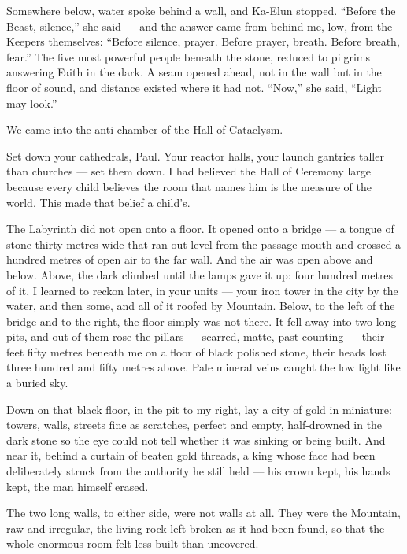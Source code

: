 Somewhere below, water spoke behind a wall, and Ka-Elun stopped. ``Before the Beast, silence,'' she said — and the answer came from behind me, low, from the Keepers themselves: ``Before silence, prayer. Before prayer, breath. Before breath, fear.'' The five most powerful people beneath the stone, reduced to pilgrims answering Faith in the dark. A seam opened ahead, not in the wall but in the floor of sound, and distance existed where it had not. ``Now,'' she said, ``Light may look.''\par
 
We came into the anti-chamber of the Hall of Cataclysm.\par
 
Set down your cathedrals, Paul. Your reactor halls, your launch gantries taller than churches — set them down. I had believed the Hall of Ceremony large because every child believes the room that names him is the measure of the world. This made that belief a child's.\par

The Labyrinth did not open onto a floor. It opened onto a bridge — a tongue of stone thirty metres wide that ran out level from the passage mouth and crossed a hundred metres of open air to the far wall. And the air was open above and below. Above, the dark climbed until the lamps gave it up: four hundred metres of it, I learned to reckon later, in your units — your iron tower in the city by the water, and then some, and all of it roofed by Mountain. Below, to the left of the bridge and to the right, the floor simply was not there. It fell away into two long pits, and out of them rose the pillars — scarred, matte, past counting — their feet fifty metres beneath me on a floor of black polished stone, their heads lost three hundred and fifty metres above. Pale mineral veins caught the low light like a buried sky.\par

Down on that black floor, in the pit to my right, lay a city of gold in miniature: towers, walls, streets fine as scratches, perfect and empty, half-drowned in the dark stone so the eye could not tell whether it was sinking or being built. And near it, behind a curtain of beaten gold threads, a king whose face had been deliberately struck from the authority he still held — his crown kept, his hands kept, the man himself erased.\par

The two long walls, to either side, were not walls at all. They were the Mountain, raw and irregular, the living rock left broken as it had been found, so that the whole enormous room felt less built than uncovered.\par


